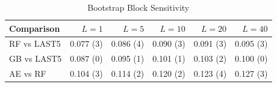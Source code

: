 \begin{table}[htbp]
\centering
\small
\caption{Bootstrap Block Sensitivity}
\label{tab:block}
\begin{tabular}{lrrrrr}
\toprule
Comparison & $L = 1$ & $L = 5$ & $L = 10$ & $L = 20$ & $L = 40$ \\
\midrule
RF vs LAST5 & 0.077 (3) & 0.086 (4) & 0.090 (3) & 0.091 (3) & 0.095 (3) \\
GB vs LAST5 & 0.087 (0) & 0.095 (1) & 0.101 (1) & 0.103 (2) & 0.100 (0) \\
AE vs RF & 0.104 (3) & 0.114 (2) & 0.120 (2) & 0.123 (4) & 0.127 (3) \\
\bottomrule
\end{tabular}
\end{table}
